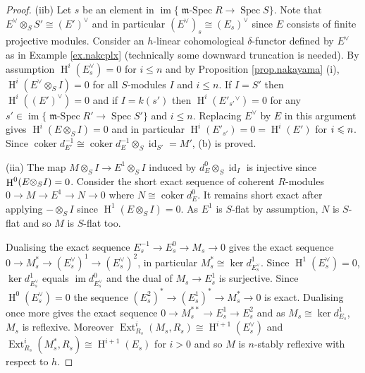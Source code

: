\documentclass[a4paper,10pt]{amsart}
\theoremstyle{plain}
\theoremstyle{definition}
\theoremstyle{remark}
\numberwithin{equation}{xx}
\DeclareMathOperator{\coker}{coker}
\DeclareMathOperator{\Ext}{Ext}
\DeclareMathOperator{\cH}{H}
\DeclareMathOperator{\id}{id}
\DeclareMathOperator{\im}{im}
\DeclareMathOperator{\mSpec}{\fr{m}-Spec}
\DeclareMathOperator{\Spec}{Spec}
\newcommand{\ra}{\rightarrow}
\newcommand{\ot}{{\otimes}}
\renewcommand{\leq}{\leqslant}
\newcommand{\fr}[1]{\mathfrak{{#1}}}
\newcommand{\xt}[4]{{\Ext} _{#2}^{#1}({#3},{#4})}
\begin{document}
\begin{proof}
(iib) Let \(s\) be an element in \(\im\{\mSpec R\ra\Spec S\}\). Note that \(E^{\vee}\ot_{S}S'\cong (E')^{\vee}\) and in particular \((E^{\vee})_{s}\cong (E_{s})^{\vee}\) since \(E\) consists of finite projective modules. 
Consider an \(h\)-linear cohomological \(\delta\)-functor defined by \(E^{\vee}\) as in Example \ref{ex.nakcplx} (technically some downward truncation is needed). By assumption \(\cH^{i}(E_{s}^{\vee})=0\) for \(i\leq n\) and by Proposition \ref{prop.nakayama} (i), \(\cH^{i}(E^{\vee}\ot_{S}I)=0\) for all \(S\)-modules \(I\) and \(i\leq n\). If \(I=S'\) then \(\cH^{i}((E')^{\vee})=0\) and if  \(I=k(s')\) then \(\cH^{i}(E'_{s'}{\!\!}^{\vee})=0\) for any \(s'\in\im\{\mSpec R'\ra\Spec S'\}\) and \(i\leq n\). Replacing \(E^{\vee}\) by \(E\) in this argument gives \(\cH^{i}(E\ot_{S}I)=0\) and in particular \(\cH^{i}(E'_{s'})=0=\cH^{i}(E')\) for \(i\/\leq n\). Since \(\coker d^{-1}_{E'}\cong \coker d^{-1}_{E}\ot_{S}{\id}_{S'}= M'\), (b) is proved. 


(iia) The map \(M\ot_{S}I\ra E^{1}\ot_{S}I\) induced by \(d_{E}^{0}\ot_{S}{\id}_{I}\) is injective since \(\cH^{0}(E\ot_{S}I)\linebreak[1]=0\). Consider the short exact sequence of coherent \(R\)-modules \(0\ra M\ra E^{1}\ra N\ra0\) where \(N\cong\coker d^{0}_{E}\). It remains short exact after applying \(-\ot_{S}I\) since \(\cH^{1}(E\ot_{S}I)=0\). As \(E^{1}\) is \(S\)-flat by assumption, \(N\) is \(S\)-flat and so \(M\) is \(S\)-flat too.

Dualising the exact sequence \(E^{-1}_{s}\ra E^{0}_{s}\ra M_{s}\ra 0\) gives the exact sequence \(0\ra M_{s}^{*}\ra (E_{s}^{\vee})^{1}\ra (E_{s}^{\vee})^{2}\), in particular \(M_{s}^{*}\cong\ker d_{E_{s}^{\vee}}^{1}\). Since \(\cH^{1}(E_{s}^{\vee})=0\), \(\ker d_{E_{s}^{\vee}}^{1}\) equals \(\im d_{E^{\vee}_{s}}^{0}\) and the dual of \(M_{s}\ra E^{1}_{s}\) is surjective. Since \(\cH^{0}(E_{s}^{\vee})=0\) the sequence \((E^{2}_{s})^{*}\ra (E^{1}_{s})^{*}\ra M_{s}^{*}\ra 0\) is exact. Dualising once more gives the exact sequence \(0\ra M_{s}^{**}\ra E^{1}_{s}\ra E^{2}_{s}\) and as \(M_{s}\cong \ker d_{E_{s}}^{1}\), \(M_{s}\) is reflexive.
Moreover \(\xt{i}{R_{s}}{M_{s}}{R_{s}}\cong\cH^{i{+}1}(E_{s}^{\vee})\) and \(\xt{i}{R_{s}}{M_{s}^{*}}{R_{s}}\cong\cH^{i{+}1}(E_{s})\) for \(i>0\) and so \(M\) is \(n\)-stably reflexive with respect to \(h\). 


\end{proof}
\end{document}
